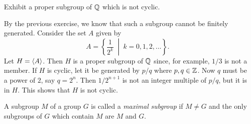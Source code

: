  Exhibit a proper subgroup of $\mathbb{Q}$ which is not cyclic.
\begin{solution}
  By the previous exercise, we know that such a subgroup cannot be
  finitely generated. Consider the set $A$ given by
  \begin{equation*}
    A = \left\{\frac1{2^k} \;\middle|\; k = 0,1,2,\dots\right\}.
  \end{equation*}
  Let $H = \langle{A}\rangle$. Then $H$ is a proper subgroup of $\mathbb{Q}$ since, for
  example, $1/3$ is not a member. If $H$ is cyclic, let it be
  generated by $p/q$ where $p,q\in\mathbb{Z}$. Now $q$ must be a power of $2$,
  say $q = 2^n$. Then $1/2^{n+1}$ is not an integer multiple of $p/q$,
  but it is in $H$. This shows that $H$ is not cyclic.
\end{solution}

 A subgroup $M$ of a group $G$ is called a {\em maximal
  subgroup} if $M\neq G$ and the only subgroups of $G$ which contain
$M$ are $M$ and $G$.
